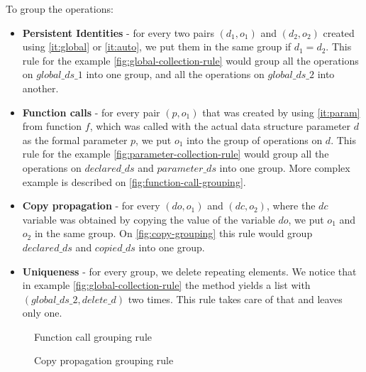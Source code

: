 \documentclass[a4paper,11pt]{article}
\begin{document}
		To group the operations:
		\begin{itemize}

            \item \textbf{Persistent Identities} - for every two pairs $(d_1, o_1)$ and $(d_2, o_2)$ created using
                \autoref{it:global} or \autoref{it:auto}, we put them in the same group if $d_1 = d_2$. This rule for the example \autoref{fig:global-collection-rule} would group all the operations on $global\_ds\_1$ into one group, and all the operations on $global\_ds\_2$ into another.

            \item \textbf{Function calls} - for every pair $(p, o_1)$ that was created by using \autoref{it:param}
                from function $f$, which was called with the actual data structure parameter $d$ as the formal parameter
                $p$, we put $o_1$ into the group of operations on $d$.
                This rule for the example \autoref{fig:parameter-collection-rule} would group all the operations on $declared\_ds$ and $parameter\_ds$ into one group. More complex example is described on \autoref{fig:function-call-grouping}.

            \item \textbf{Copy propagation} - for every $(do, o_1)$ and $(dc, o_2)$, where the $dc$ variable was
                obtained by copying the value of the variable $do$, we put $o_1$ and $o_2$ in the same group. On \autoref{fig:copy-grouping} this rule would group 
                $declared\_ds$ and $copied\_ds$ into one group.

            \item \textbf{Uniqueness} - for every group, we delete repeating elements. We notice that in example \autoref{fig:global-collection-rule} the method yields a list with $(global\_ds\_2, delete\_d)$ two times. This rule takes care of that and leaves only one.

		\end{itemize}

        \begin{figure}[h]
            

            \caption{Function call grouping rule}

            \label{fig:function-call-grouping}
        \end{figure}


        \begin{figure}[h]
            

            \caption{Copy propagation grouping rule}

            \label{fig:copy-grouping}
        \end{figure}
\end{document}
